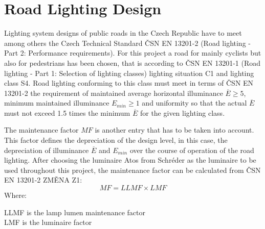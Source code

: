 \section{Road Lighting Design}
Lighting system designs of public roads in the Czech Republic have to meet among others the Czech Technical Standard \v{C}SN EN 13201-2 (Road lighting - Part 2: Performance requirements). For this project a road for mainly cyclists but also for pedestrians has been chosen, that is according to \v{C}SN EN 13201-1 (Road lighting - Part 1: Selection of lighting classes) lighting situation C1 and lighting class S4. Road lighting conforming to this class must meet in terms of \v{C}SN EN 13201-2 the requirement of maintained average horizontal illuminance $\overline{E}\geq 5$, minimum maintained illuminance $E_{min}\geq 1$ and uniformity so that the actual $\overline{E}$ must not exceed 1.5 times the minimum $\overline{E}$ for the given lighting class.

The maintenance factor $MF$ is another entry that has to be taken into account. This factor defines the depreciation of the design level, in this case, the depreciation of illuminance $\overline{E}$ and $E_{min}$ over the course of operation of the road lighting. After choosing the luminaire Atos from Schr\'{e}der as the luminaire to be used throughout this project, the maintenance factor can be calculated from \v{C}SN EN 13201-2 ZM\v{E}NA Z1:
\begin{equation}
MF=LLMF \times LMF
\end{equation}
Where:
\begin{description}
	\item[LLMF is the lamp lumen maintenance factor] 
	\item[LMF is the luminaire factor]
\end{description}
